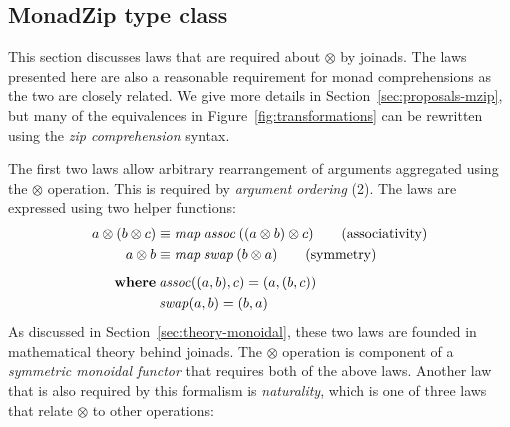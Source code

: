 \documentclass{sigplanconf}
\newcommand{\Varid}[1]{\mathit{#1}}
\begin{document}

\subsection{MonadZip type class}
\label{sec:laws-monadzip}
This section discusses laws that are required about \ensuremath{\otimes} by joinads. The laws 
presented here are also a reasonable requirement for monad comprehensions as the two are closely
related. We give more details in Section~\ref{sec:proposals-mzip}, but many of the equivalences in 
Figure~\ref{fig:transformations} can be rewritten using the \textit{zip comprehension} syntax. 

The first two laws allow arbitrary rearrangement of arguments aggregated using the \ensuremath{\otimes} operation.
This is required by \textit{argument ordering} (2). The laws are expressed using two helper functions:
\begin{align*}
  a \mzip (b \mzip c) &\equiv \map \: \Varid{assoc} \: ((a \mzip b) \mzip c) \tag{associativity} \\
  a \mzip b &\equiv \map \: \Varid{swap} \: (b \mzip a) \tag{symmetry} \\
\\[-10pt]
  \textbf{where} & \: \Varid{assoc}((a,b), c) = (a,(b,c))\\
                 & \: \Varid{swap}(a,b) = (b,a)
\end{align*}
As discussed in Section~\ref{sec:theory-monoidal}, these two laws are founded in mathematical theory 
behind joinads. The \ensuremath{\otimes} operation is component of a \textit{symmetric monoidal functor} that requires 
both of the above laws. Another law that is also required by this formalism is \textit{naturality}, which 
is one of three laws that relate \ensuremath{\otimes} to other operations:
\end{document}
